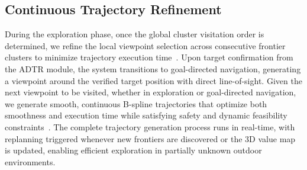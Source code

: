 \subsection{Continuous Trajectory Refinement}\label{V-D}
During the exploration phase, once the global cluster visitation order is 
determined, we refine the local viewpoint selection across consecutive frontier clusters to minimize trajectory execution time~\cite{zhou2021fuel}. 
Upon target confirmation from the ADTR module, the system transitions to goal-directed navigation, generating a viewpoint around the verified target position with direct line-of-sight. 
Given the next viewpoint to be visited, whether in exploration or goal-directed navigation, we generate smooth, continuous B-spline trajectories that optimize both smoothness and execution time while satisfying safety and dynamic feasibility constraints~\cite{zhou2019robust}. 
The complete trajectory generation process runs in real-time, with replanning triggered whenever new frontiers are discovered or the 3D value map is updated, enabling efficient exploration in partially unknown outdoor environments.
